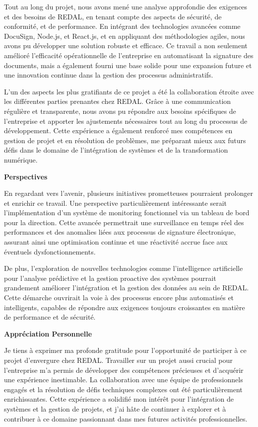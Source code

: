 \begin{doublespace}
Tout au long du projet, nous avons mené une analyse approfondie des exigences et des besoins de REDAL, en tenant compte des aspects de sécurité, de conformité, et de performance. En intégrant des technologies avancées comme DocuSign, Node.js, et React.js, et en appliquant des méthodologies agiles, nous avons pu développer une solution robuste et efficace. Ce travail a non seulement amélioré l'efficacité opérationnelle de l'entreprise en automatisant la signature des documents, mais a également fourni une base solide pour une expansion future et une innovation continue dans la gestion des processus administratifs.

L'un des aspects les plus gratifiants de ce projet a été la collaboration étroite avec les différentes parties prenantes chez REDAL. Grâce à une communication régulière et transparente, nous avons pu répondre aux besoins spécifiques de l'entreprise et apporter les ajustements nécessaires tout au long du processus de développement. Cette expérience a également renforcé mes compétences en gestion de projet et en résolution de problèmes, me préparant mieux aux futurs défis dans le domaine de l'intégration de systèmes et de la transformation numérique.

\textbf{Perspectives}

En regardant vers l'avenir, plusieurs initiatives prometteuses pourraient prolonger et enrichir ce travail. Une perspective particulièrement intéressante serait l'implémentation d'un système de monitoring fonctionnel via un tableau de bord pour la direction. Cette avancée permettrait une surveillance en temps réel des performances et des anomalies liées aux processus de signature électronique, assurant ainsi une optimisation continue et une réactivité accrue face aux éventuels dysfonctionnements.

De plus, l'exploration de nouvelles technologies comme l'intelligence artificielle pour l'analyse prédictive et la gestion proactive des systèmes pourrait grandement améliorer l'intégration et la gestion des données au sein de REDAL. Cette démarche ouvrirait la voie à des processus encore plus automatisés et intelligents, capables de répondre aux exigences toujours croissantes en matière de performance et de sécurité.

\textbf{Appréciation Personnelle}

Je tiens à exprimer ma profonde gratitude pour l'opportunité de participer à ce projet d'envergure chez REDAL. Travailler sur un projet aussi crucial pour l'entreprise m'a permis de développer des compétences précieuses et d'acquérir une expérience inestimable. La collaboration avec une équipe de professionnels engagés et la résolution de défis techniques complexes ont été particulièrement enrichissantes. Cette expérience a solidifié mon intérêt pour l'intégration de systèmes et la gestion de projets, et j'ai hâte de continuer à explorer et à contribuer à ce domaine passionnant dans mes futures activités professionnelles.
\end{doublespace}

